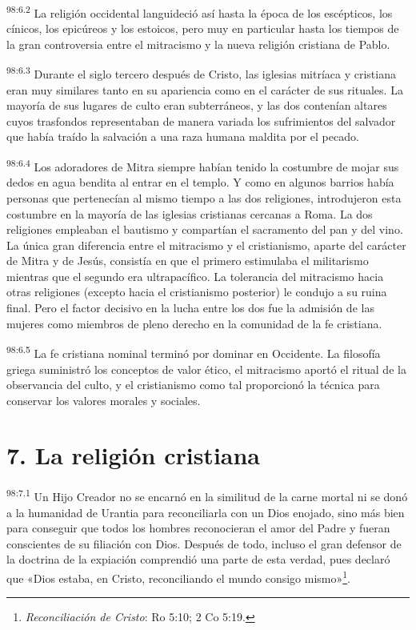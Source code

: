\par
\textsuperscript{98:6.2} La religión occidental languideció así hasta la época de los escépticos, los cínicos, los epicúreos y los estoicos, pero muy en particular hasta los tiempos de la gran controversia entre el mitracismo y la nueva religión cristiana de Pablo.

\par
\textsuperscript{98:6.3} Durante el siglo tercero después de Cristo, las iglesias mitríaca y cristiana eran muy similares tanto en su apariencia como en el carácter de sus rituales. La mayoría de sus lugares de culto eran subterráneos, y las dos contenían altares cuyos trasfondos representaban de manera variada los sufrimientos del salvador que había traído la salvación a una raza humana maldita por el pecado.

\par
\textsuperscript{98:6.4} Los adoradores de Mitra siempre habían tenido la costumbre de mojar sus dedos en agua bendita al entrar en el templo. Y como en algunos barrios había personas que pertenecían al mismo tiempo a las dos religiones, introdujeron esta costumbre en la mayoría de las iglesias cristianas cercanas a Roma. La dos religiones empleaban el bautismo y compartían el sacramento del pan y del vino. La única gran diferencia entre el mitracismo y el cristianismo, aparte del carácter de Mitra y de Jesús, consistía en que el primero estimulaba el militarismo mientras que el segundo era ultrapacífico. La tolerancia del mitracismo hacia otras religiones (excepto hacia el cristianismo posterior) le condujo a su ruina final. Pero el factor decisivo en la lucha entre los dos fue la admisión de las mujeres como miembros de pleno derecho en la comunidad de la fe cristiana.

\par
\textsuperscript{98:6.5} La fe cristiana nominal terminó por dominar en Occidente. La filosofía griega suministró los conceptos de valor ético, el mitracismo aportó el ritual de la observancia del culto, y el cristianismo como tal proporcionó la técnica para conservar los valores morales y sociales.

\section*{7. La religión cristiana}
\par
\textsuperscript{98:7.1} Un Hijo Creador no se encarnó en la similitud de la carne mortal ni se donó a la humanidad de Urantia para reconciliarla con un Dios enojado, sino más bien para conseguir que todos los hombres reconocieran el amor del Padre y fueran conscientes de su filiación con Dios. Después de todo, incluso el gran defensor de la doctrina de la expiación comprendió una parte de esta verdad, pues declaró que «Dios estaba, en Cristo, reconciliando el mundo consigo mismo»\footnote{\textit{Reconciliación de Cristo}: Ro 5:10; 2 Co 5:19.}.

